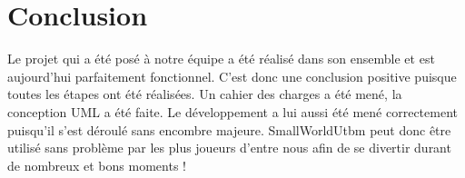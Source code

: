 \documentclass[a4paper, 11pt]{article}
\begin{document}
	\vspace*{2cm}
	\section*{Conclusion}
	
	Le projet qui a été posé à notre équipe a été réalisé dans son ensemble et est aujourd'hui parfaitement fonctionnel. C'est donc une conclusion positive puisque toutes les étapes ont été réalisées. Un cahier des charges a été mené, la conception UML a été faite. Le développement a lui aussi été mené correctement puisqu'il s'est déroulé sans encombre majeure. SmallWorldUtbm peut donc être utilisé sans problème par les plus joueurs d'entre nous afin de se divertir durant de nombreux et bons moments !
		
		
	\newpage	
	
\end{document}
